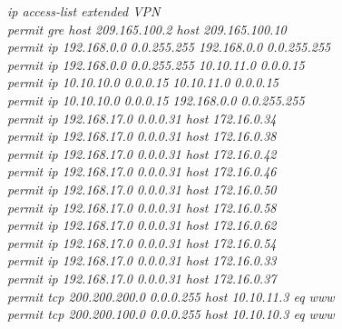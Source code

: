 \documentclass[a4paper, 12pt]{article}
\begin{document}
\hspace*{2cm}\textit{ip access-list extended VPN\\
\hspace*{2cm}permit gre host 209.165.100.2 host 209.165.100.10\\
\hspace*{2cm}permit ip 192.168.0.0 0.0.255.255 192.168.0.0 0.0.255.255\\
\hspace*{2cm}permit ip 192.168.0.0 0.0.255.255 10.10.11.0 0.0.0.15\\
\hspace*{2cm}permit ip 10.10.10.0 0.0.0.15 10.10.11.0 0.0.0.15\\
\hspace*{2cm}permit ip 10.10.10.0 0.0.0.15 192.168.0.0 0.0.255.255\\
\hspace*{2cm}permit ip 192.168.17.0 0.0.0.31 host 172.16.0.34\\
\hspace*{2cm}permit ip 192.168.17.0 0.0.0.31 host 172.16.0.38\\
\hspace*{2cm}permit ip 192.168.17.0 0.0.0.31 host 172.16.0.42\\
\hspace*{2cm}permit ip 192.168.17.0 0.0.0.31 host 172.16.0.46\\
\hspace*{2cm}permit ip 192.168.17.0 0.0.0.31 host 172.16.0.50\\
\hspace*{2cm}permit ip 192.168.17.0 0.0.0.31 host 172.16.0.58\\
\hspace*{2cm}permit ip 192.168.17.0 0.0.0.31 host 172.16.0.62\\
\hspace*{2cm}permit ip 192.168.17.0 0.0.0.31 host 172.16.0.54\\
\hspace*{2cm}permit ip 192.168.17.0 0.0.0.31 host 172.16.0.33\\
\hspace*{2cm}permit ip 192.168.17.0 0.0.0.31 host 172.16.0.37\\
\hspace*{2cm}permit tcp 200.200.200.0 0.0.0.255 host 10.10.11.3 eq www\\
\hspace*{2cm}permit tcp 200.200.100.0 0.0.0.255 host 10.10.10.3 eq www\\}
\end{document}
